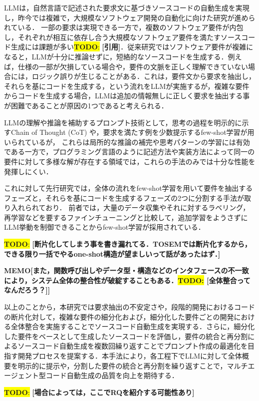 \documentclass[submit,techrep,noauthor]{ipsj}
\newcommand{\todo}[1]{\colorbox{yellow}{{\bf TODO}:}{\color{red} {\textbf{[#1]}}}}
\newcommand{\memo}[1]{\colorbox{magenta!30}{\textbf{MEMO}}{\color{red!50}\textbf{[#1]}}}
\begin{document}
LLMは，自然言語で記述された要求文に基づきソースコードの自動生成を実現し，昨今では複雑で，大規模なソフトウェア開発の自動化に向けた研究が進められている．\cite{LLM_CodeGeneration} 一部の要求は実現できる一方で，複数のソフトウェア要件が内包し，それぞれが相互に依存し合う大規模なソフトウェア要件を満たすソースコード生成には課題が多い\todo{引用}．従来研究ではソフトウェア要件が複雑になると，LLMが十分に推論せずに，短絡的なソースコードを生成する．例えば，仕様の一部が欠損している場合や，要件の文脈を正しく理解できていない場合には，ロジック誤りが生じることがある．これは，要件文から要求を抽出し，それらを基にコードを生成する，という流れをLLMが実施するが，複雑な要件からコードを生成する場合，LLMは追加の情報無しに正しく要求を抽出する事が困難であることが原因の1つであると考えられる．

LLMの理解や推論を補助するプロンプト技術として，思考の過程を明示的に示すChain of Thought (CoT) や，要求を満たす例を少数提示するfew-shot学習が用いられているが，\cite{LLM_fewshot} これらは局所的な推論の補完や思考パターンの学習には有効である一方で，プログラミング言語のように記述方法や実装方法によって同一の要件に対して多様な解が存在する領域では，これらの手法のみでは十分な性能を発揮しにくい．

これに対して先行研究では，全体の流れをfew-shot学習を用いて要件を抽出するフェーズと，それらを基にコードを生成するフェーズの2つに分割する手法が取り入れられており．\cite{tosem} 前者では，大量のデータ収集やそれに対するラベリング，再学習などを要するファインチューニングと比較して，追加学習をようさずにLLM挙動を制御できることからfew-shot学習が採用されている．

\todo{断片化してしまう事を書き漏れてる．TOSEMでは断片化するから，できる限り一括でやるone-shot構造が望ましいって話があったはず．}

\memo{また，関数呼び出しやデータ型・構造などのインタフェースの不一致により，システム全体の整合性が破綻することもある．\todo{全体整合ってなんだろう？}}

以上のことから，本研究では要求抽出の不安定さや，段階的開発におけるコードの断片化対して，複雑な要件の細分化および，細分化した要件ごとの開発における全体整合を実施することでソースコード自動生成を実現する．さらに，細分化した要件をベースとして生成したソースコードを評価し，要件の統合と再分割によるソースコード自動生成を複数回繰り返すことでプロンプト作成の最適化を目指す開発プロセスを提案する．本手法により，各工程下でLLMに対して全体概要を明示的に提示や，分割した要件の統合と再分割を繰り返すことで，マルチエージェント型コード自動生成の品質を向上を期待する．

\todo{場合によっては，ここでRQを紹介する可能性あり}
\end{document}
